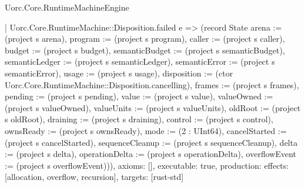 \begin{lexlean}{Uorc.Core.RuntimeMachineEngine}
\begin{semanticmodule}
{    | Uorc.Core.RuntimeMachine::Disposition.failed e => (record State {arena := (project s arena), program := (project s program), caller := (project s caller), budget := (project s budget), semanticBudget := (project s semanticBudget), semanticLedger := (project s semanticLedger), semanticError := (project s semanticError), usage := (project s usage), disposition := (ctor Uorc.Core.RuntimeMachine::Disposition.cancelling), frames := (project s frames), pending := (project s pending), value := (project s value), valueOwned := (project s valueOwned), valueUnits := (project s valueUnits), oldRoot := (project s oldRoot), draining := (project s draining), control := (project s control), ownsReady := (project s ownsReady), mode := (2 : UInt64), cancelStarted := (project s cancelStarted), sequenceCleanup := (project s sequenceCleanup), delta := (project s delta), operationDelta := (project s operationDelta), overflowEvent := (project s overflowEvent)})),
  axioms: [],
  executable: true,
  production: {effects: [allocation, overflow, recursion], targets: [rust-std]}
}


\end{semanticmodule}
\end{lexlean}
